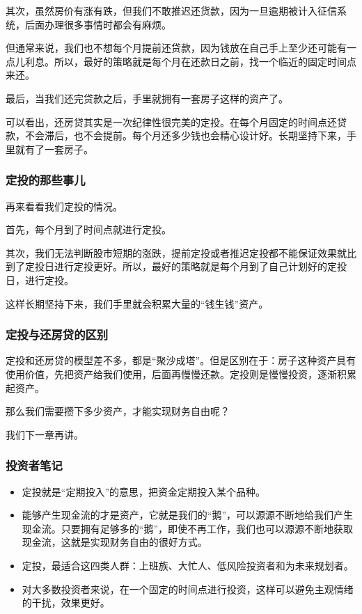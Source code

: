 其次，虽然房价有涨有跌，但我们不敢推迟还货款，因为一旦逾期被计入征信系统，后面办理很多事情时都会有麻烦。

但通常来说，我们也不想每个月提前还贷款，因为钱放在自己手上至少还可能有一点儿利息。所以，最好的策略就是每个月在还款日之前，找一个临近的固定时间点来还。

最后，当我们还完贷款之后，手里就拥有一套房子这样的资产了。

可以看出，还房贷其实是一次纪律性很完美的定投。在每个月固定的时间点还贷款，不会滞后，也不会提前。每个月还多少钱也会精心设计好。长期坚持下来，手里就有了一套房子。

\subsubsection{定投的那些事儿}

再来看看我们定投的情况。

首先，每个月到了时间点就进行定投。

其次，我们无法判断股市短期的涨跌，提前定投或者推迟定投都不能保证效果就比到了定投日进行定投更好。所以，最好的策略就是每个月到了自己计划好的定投日，进行定投。

这样长期坚持下来，我们手里就会积累大量的“钱生钱”资产。

\subsubsection{定投与还房贷的区别}

定投和还房贷的模型差不多，都是“聚沙成塔”。但是区别在于：房子这种资产具有使用价值，先把资产给我们使用，后面再慢慢还款。定投则是慢慢投资，逐渐积累起资产。

那么我们需要攒下多少资产，才能实现财务自由呢？

我们下一章再讲。

\subsubsection{投资者笔记}

\begin{itemize}
\item {\kaishu 定投就是“定期投入”的意思，把资金定期投入某个品种。}
\item {\kaishu 能够产生现金流的才是资产，它就是我们的“鹅”，可以源源不断地给我们产生现金流。只要拥有足够多的“鹅”，即使不再工作，我们也可以源源不断地获取现金流，这就是实现财务自由的很好方式。}
\item {\kaishu 定投，最适合这四类人群：上班族、大忙人、低风险投资者和为未来规划者。}
\item {\kaishu 对大多数投资者来说，在一个固定的时间点进行投资，这样可以避免主观情绪的干扰，效果更好。}
\end{itemize}
